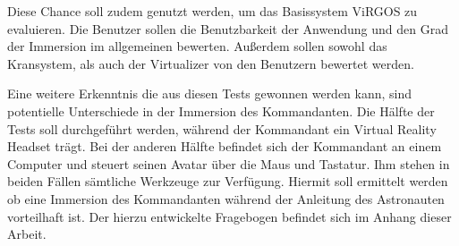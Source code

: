 Diese Chance soll zudem genutzt werden, um das Basissystem ViRGOS zu evaluieren. Die Benutzer sollen die Benutzbarkeit der Anwendung und den Grad der Immersion im allgemeinen bewerten. Außerdem sollen sowohl das Kransystem, als auch der Virtualizer von den Benutzern bewertet werden. 

Eine weitere Erkenntnis die aus diesen Tests gewonnen werden kann, sind potentielle Unterschiede in der Immersion des Kommandanten. Die Hälfte der Tests soll durchgeführt werden, während der Kommandant ein Virtual Reality Headset trägt. Bei der anderen Hälfte befindet sich der Kommandant an einem Computer und steuert seinen Avatar über die Maus und Tastatur. Ihm stehen in beiden Fällen sämtliche Werkzeuge zur Verfügung. Hiermit soll ermittelt werden ob eine Immersion des Kommandanten während der Anleitung des Astronauten vorteilhaft ist. Der hierzu entwickelte Fragebogen befindet sich im Anhang dieser Arbeit.